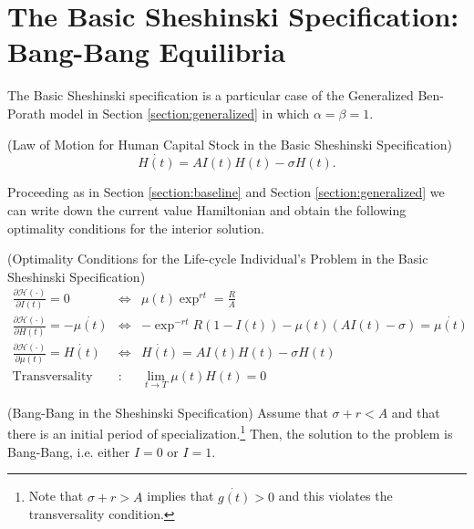  
\section{The Basic Sheshinski Specification: Bang-Bang Equilibria}
The Basic Sheshinski specification is a particular case of the Generalized Ben-Porath model in Section \ref{section:generalized} in which $\alpha = \beta = 1$.
\begin{definition} (Law of Motion for Human Capital Stock in the Basic Sheshinski Specification)
\begin{equation}
\dot{H(t)} = AI(t)H(t) - \sigma H(t).
\end{equation}
\end{definition}

\indent Proceeding as in Section \ref{section:baseline} and Section \ref{section:generalized} we can write down the current value Hamiltonian and obtain the following optimality conditions for the interior solution.

\begin{condition} (Optimality Conditions for the Life-cycle Individual's Problem in the Basic Sheshinski Specification)
\begin{eqnarray}
\frac{\partial \mathcal{H} (\cdot)}{\partial I(t)} = 0 &\Leftrightarrow& \mu(t) \exp^{rt} = \frac{R}{A} \label{eq:focinvestmentshenbasic} \\
\frac{\partial \mathcal{H} (\cdot)}{\partial H(t)} = - \dot{\mu(t)} &\Leftrightarrow& - \exp^{-rt} R(1 - I(t)) - \mu(t) \left( A I(t) - \sigma \right) = \dot{\mu(t)} \label{eq:focstockshenbasic} \\ 
\frac{\partial \mathcal{H} (\cdot)}{\partial \mu(t)} = \dot{H(t)} &\Leftrightarrow& \dot{H(t)} =  A I(t) H(t)- \sigma H(t) \label{eq:focmotionshenbasic} \\
\text{Transversality} &:& \lim_{t \rightarrow T} \mu(t) H(t) = 0 \label{eq:foctransversalityshenbasic}
\end{eqnarray}
\end{condition}

\begin{claim} (Bang-Bang in the Sheshinski Specification) \label{claim:bangbang}
Assume that $\sigma + r < A$ and that there is an initial period of specialization.\footnote{Note that $\sigma + r > A$ implies that $\dot{g(t)} > 0$ and this violates the transversality condition.} Then, the solution to the problem is Bang-Bang, i.e. either $I = 0$ or $I = 1$. 
\end{claim}

